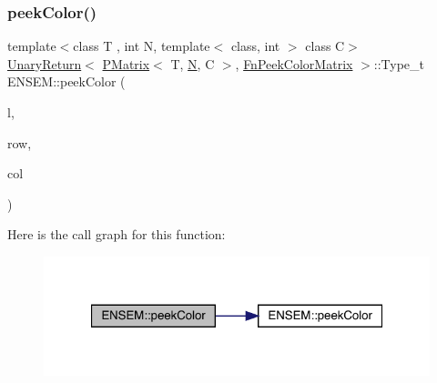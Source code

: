 \subsubsection{\texorpdfstring{peekColor()}{peekColor()}\hspace{0.1cm}{\footnotesize\ttfamily [2/2]}}
{\footnotesize\ttfamily template$<$class T , int N, template$<$ class, int $>$ class C$>$ \\
\mbox{\hyperlink{structENSEM_1_1UnaryReturn}{Unary\+Return}}$<$ \mbox{\hyperlink{classENSEM_1_1PMatrix}{P\+Matrix}}$<$ T, \mbox{\hyperlink{operator__name__util_8cc_a7722c8ecbb62d99aee7ce68b1752f337}{N}}, C $>$, \mbox{\hyperlink{structENSEM_1_1FnPeekColorMatrix}{Fn\+Peek\+Color\+Matrix}} $>$\+::Type\+\_\+t E\+N\+S\+E\+M\+::peek\+Color (\begin{DoxyParamCaption}\item[{const \mbox{\hyperlink{classENSEM_1_1PMatrix}{P\+Matrix}}$<$ T, \mbox{\hyperlink{operator__name__util_8cc_a7722c8ecbb62d99aee7ce68b1752f337}{N}}, C $>$ \&}]{l,  }\item[{int}]{row,  }\item[{int}]{col }\end{DoxyParamCaption})\hspace{0.3cm}{\ttfamily [inline]}}

Here is the call graph for this function\+:\nopagebreak
\begin{figure}[H]
\begin{center}
\leavevmode
\includegraphics[width=321pt]{df/d0a/group__primmatrix_gaa9e8d0698d08d9e4b6924a14192c17b4_cgraph}
\end{center}
\end{figure}
\mbox{\label{group__primmatrix_gaf26619f85146d483d1c177abf5c2f476}} 
